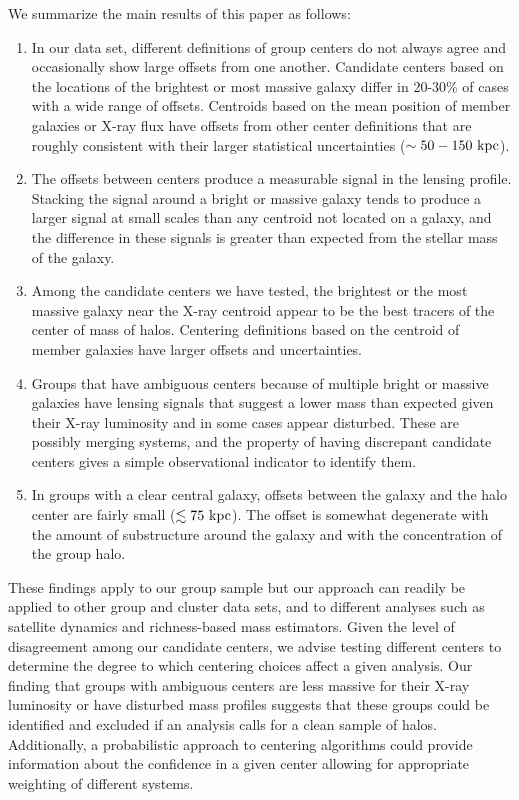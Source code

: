 \documentclass[12pt]{emulateapj}
\begin{document}
We summarize the main results of this paper as follows:
\begin{enumerate}
\item In our data set, different definitions of group centers do not
  always agree and occasionally show large offsets from one another. Candidate centers
  based on the locations of the brightest or most massive galaxy
  differ in 20-30\% of cases with a wide range of offsets. Centroids based on the
  mean position of member galaxies or X-ray flux have offsets
  from other center definitions that are roughly
  consistent with their larger statistical uncertainties ($\sim50-150~{\rm kpc}$).
\item The offsets between centers produce a measurable signal in the
  lensing profile. Stacking the signal around a bright or massive
  galaxy tends to produce a larger signal at small scales than any
  centroid not located on a galaxy, and the difference in
  these signals is greater than expected from the stellar mass of the galaxy.
\item Among the candidate centers we have tested, the brightest or the
  most massive galaxy near the X-ray centroid appear to be the best
  tracers of the center of mass of halos. Centering definitions based
  on the centroid of member galaxies have larger offsets and uncertainties.
\item Groups that have ambiguous centers because of multiple bright or
  massive galaxies have lensing signals that suggest a lower mass than expected given their X-ray
  luminosity and in some cases appear
    disturbed. These are possibly merging systems, and the property
  of having discrepant candidate centers gives a simple observational
  indicator to identify them.
\item In groups with a clear central galaxy, offsets between the
  galaxy and the halo center are fairly small ($\lesssim 75~{\rm
    kpc}$).  The offset is somewhat degenerate with the amount of
  substructure around the galaxy and with the concentration of the
  group halo.
\end{enumerate}

These findings apply to our group sample but our approach can readily
be applied to other group and cluster data sets, and to different
analyses such as satellite dynamics and richness-based mass
estimators. Given the level of disagreement among our candidate
centers, we advise testing different centers to determine the degree
to which centering choices affect a given analysis. Our finding that groups
with ambiguous centers are less massive for their
  X-ray luminosity or have disturbed mass profiles suggests that
these groups could be identified and excluded if an analysis calls for
a clean sample of halos. Additionally, a probabilistic approach to 
centering algorithms could provide information about the confidence in
a given center allowing for appropriate weighting of different systems.
\end{document}

